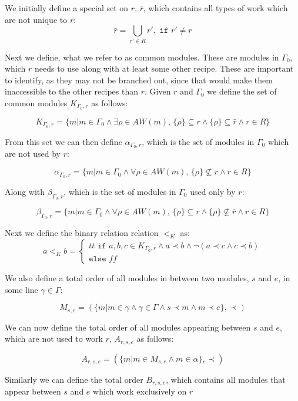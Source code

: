 We initially define a special set on $r$, $\bar{r}$, which contains all types of work which are not unique to $r$:
\[\bar{r} = \bigcup_{r' \in R}r', \texttt{ if } r' \neq r\]

Next we define, what we refer to as common modules. These are modules in $\Gamma_0$, which $r$ needs to use along with at least some other recipe. These are important to identify, as they may not be branched out, since that would make them inaccessible to the other recipes than $r$. Given $r$ and $\Gamma_0$ we define the set of common modules $K_{\Gamma_0,r}$ as follows:

\[K_{\Gamma_0 ,r} = \{m | m \in \Gamma_0  \land \exists \rho \in AW(m),\, \{\rho\} \subseteq r \land \{\rho\} \subseteq \bar{r} \land r \in R\}\]

From this set we can then define $\alpha_{\Gamma_0 ,r}$, which is the set of modules in $\Gamma_0$ which are not used by $r$: 

\[\alpha_{\Gamma_0 ,r}  = \{m |m \in \Gamma_0 \land \forall \rho \in AW(m),\, \{\rho\} \nsubseteq r \land r \in R\}\]

Along with $\beta_{\Gamma_0 ,r}$, which is the set of modules in $\Gamma_0$ used only by $r$:

\[\beta_{\Gamma_0 ,r}  = \{m  | m \in \Gamma_0 \land \forall \rho \in AW(m),\, \{\rho\} \subseteq r \land \{\rho\} \nsubseteq \bar{r} \land r \in R\}\]

Next we define the binary relation relation $<_K$ as:
\[a <_K b = \left\{\begin{matrix}
tt \texttt{ if } a,b,c \in K_{\Gamma_0 ,r} \land a \prec b \land \lnot (a \prec c \land c \prec b) \\ \texttt{else } ff
\end{matrix}\right.\]

We also define a total order of all modules in between two modules, $s$ and $e$, in some line $\gamma \in \Gamma$:

\[M_{s,e} = (\{m | m \in \gamma \land \gamma \in \Gamma \land s \prec m \land m \prec e\}, \prec)\]

We can now define the total order of all modules appearing between $s$ and $e$, which are not used to work $r$, $A_{r,s,e}$ as follows: 

\[A_{r,s,e} = (\{m |m \in M_{s,e} \land m \in \alpha\}, \prec)\]

Similarly we can define the total order $B_{r,s,e}$, which contains all modules that appear between $s$ and $e$ which work exclusively on $r$

